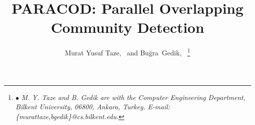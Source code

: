 



\title{PARACOD: Parallel Overlapping Community Detection}

\author{Murat Yusuf Taze,~ and Bu\u{g}ra~Gedik,~%
\thanks{$\bullet$ \emph{M. Y. Taze and B. Gedik are with the Computer Engineering Department, 
                        Bilkent University, 06800, Ankara, Turkey. E-mail: \{murattaze,bgedik\}@cs.bilkent.edu. }}}

\IEEEcompsoctitleabstractindextext{}
\maketitle





 



